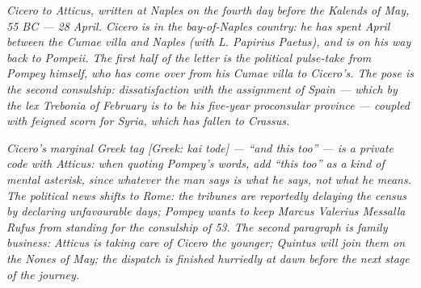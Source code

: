 
\textit{Cicero to Atticus, written at Naples on the fourth day
before the Kalends of May, 55 BC --- 28 April. Cicero is in
the bay-of-Naples country: he has spent April between the
Cumae villa and Naples (with L. Papirius Paetus), and is on
his way back to Pompeii. The first half of the letter is the
political pulse-take from Pompey himself, who has come over
from his Cumae villa to Cicero's. The pose is the second
consulship: dissatisfaction with the assignment of Spain ---
which by the lex Trebonia of February is to be his five-year
proconsular province --- coupled with feigned scorn for
Syria, which has fallen to Crassus.}

\textit{Cicero's marginal Greek tag \textit{[Greek: kai tode]}
--- ``and this too'' --- is a private code with Atticus: when
quoting Pompey's words, add ``this too'' as a kind of mental
asterisk, since whatever the man says is what he says, not
what he means. The political news shifts to Rome: the
tribunes are reportedly delaying the census by declaring
unfavourable days; Pompey wants to keep Marcus Valerius
Messalla Rufus from standing for the consulship of 53. The
second paragraph is family business: Atticus is taking care
of Cicero the younger; Quintus will join them on the Nones
of May; the dispatch is finished hurriedly at dawn before
the next stage of the journey.}
